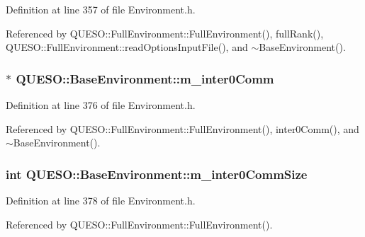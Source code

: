Definition at line 357 of file Environment.\-h.



Referenced by Q\-U\-E\-S\-O\-::\-Full\-Environment\-::\-Full\-Environment(), full\-Rank(), Q\-U\-E\-S\-O\-::\-Full\-Environment\-::read\-Options\-Input\-File(), and $\sim$\-Base\-Environment().

\hypertarget{class_q_u_e_s_o_1_1_base_environment_a5107d456b4267a20f3f48222e52f0c7b}{
\subsubsection[{m\-\_\-inter0\-Comm}]{$\ast$ Q\-U\-E\-S\-O\-::\-Base\-Environment\-::m\-\_\-inter0\-Comm\hspace{0.3cm}{\ttfamily [protected]}}}\label{class_q_u_e_s_o_1_1_base_environment_a5107d456b4267a20f3f48222e52f0c7b}


Definition at line 376 of file Environment.\-h.



Referenced by Q\-U\-E\-S\-O\-::\-Full\-Environment\-::\-Full\-Environment(), inter0\-Comm(), and $\sim$\-Base\-Environment().

\hypertarget{class_q_u_e_s_o_1_1_base_environment_ad7a98e45d9c0379a78ee7937f83f3ec1}{
\subsubsection[{m\-\_\-inter0\-Comm\-Size}]{\setlength{\rightskip}{0pt plus 5cm}int Q\-U\-E\-S\-O\-::\-Base\-Environment\-::m\-\_\-inter0\-Comm\-Size\hspace{0.3cm}{\ttfamily [protected]}}}\label{class_q_u_e_s_o_1_1_base_environment_ad7a98e45d9c0379a78ee7937f83f3ec1}


Definition at line 378 of file Environment.\-h.



Referenced by Q\-U\-E\-S\-O\-::\-Full\-Environment\-::\-Full\-Environment().

